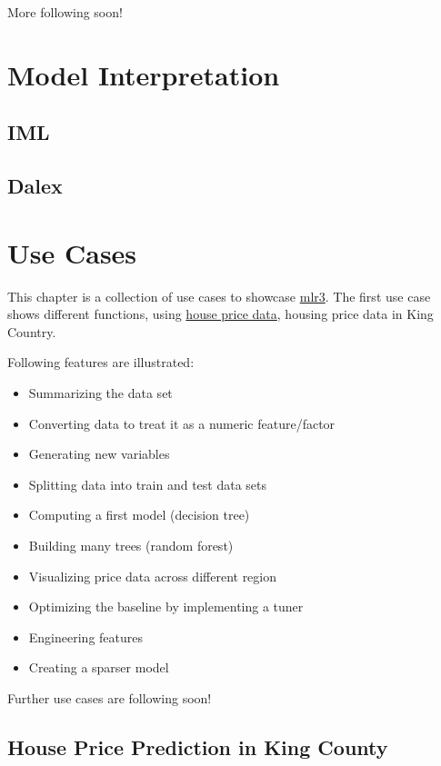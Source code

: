 \documentclass[]{article}
\providecommand{\tightlist}{%
  \setlength{\itemsep}{0pt}\setlength{\parskip}{0pt}}
\begin{document}
More following soon!

\hypertarget{interpretation}{%
\section{Model Interpretation}\label{interpretation}}

\hypertarget{iml}{%
\subsection{IML}\label{iml}}

\hypertarget{dalex}{%
\subsection{Dalex}\label{dalex}}

\hypertarget{use-cases}{%
\section{Use Cases}\label{use-cases}}

This chapter is a collection of use cases to showcase \href{https://mlr3.mlr-org.com}{mlr3}.
The first use case shows different functions, using \protect\hyperlink{use-case-regr-houses}{house price data}, housing price data in King Country.

Following features are illustrated:

\begin{itemize}
\tightlist
\item
  Summarizing the data set
\item
  Converting data to treat it as a numeric feature/factor
\item
  Generating new variables
\item
  Splitting data into train and test data sets
\item
  Computing a first model (decision tree)
\item
  Building many trees (random forest)
\item
  Visualizing price data across different region
\item
  Optimizing the baseline by implementing a tuner
\item
  Engineering features
\item
  Creating a sparser model
\end{itemize}

Further use cases are following soon!

\hypertarget{use-case-regr-houses}{%
\subsection{House Price Prediction in King County}\label{use-case-regr-houses}}
\end{document}

